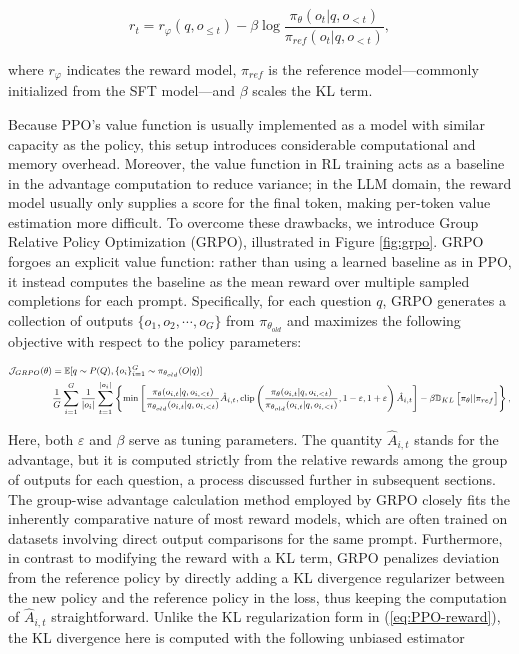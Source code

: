 \begin{equation}
    r_{t} = r_\varphi(q, o_{\le t}) - \beta \log\frac{\pi_{\theta}(o_{t}|q, o_{<t})}{\pi_{ref}(o_{t}|q, o_{<t})},
\label{eq:PPO-reward}
\end{equation}

where $r_\varphi$ indicates the reward model, $\pi_{ref}$ is the reference model—commonly initialized from the SFT model—and $\beta$ scales the KL term.

Because PPO’s value function is usually implemented as a model with similar capacity as the policy, this setup introduces considerable computational and memory overhead. Moreover, the value function in RL training acts as a baseline in the advantage computation to reduce variance; in the LLM domain, the reward model usually only supplies a score for the final token, making per-token value estimation more difficult. To overcome these drawbacks, we introduce Group Relative Policy Optimization (GRPO), illustrated in Figure \ref{fig:grpo}. GRPO forgoes an explicit value function: rather than using a learned baseline as in PPO, it instead computes the baseline as the mean reward over multiple sampled completions for each prompt. Specifically, for each question $q$, GRPO generates a collection of outputs $\{o_1, o_2, \cdots, o_G\}$ from $\pi_{\theta_{old}}$ and maximizes the following objective with respect to the policy parameters:

\begin{equation}
\footnotesize
\begin{split}
    \mathcal{J}_{GRPO}(\theta) &= \mathbb{E}{[q \sim P(Q), \{o_i\}_{i=1}^G \sim \pi_{\theta_{old}}(O|q)]}  \\
    & \frac{1}{G}\sum_{i=1}^G\frac{1}{|o_i|} \sum_{t=1}^{|o_i|} \left\{ \min \left[ \frac{\pi_\theta(o_{i,t} | q, o_{i,<t})}{\pi_{\theta_{old}}(o_{i,t} | q, o_{i,<t})} \hat{A}_{i,t}, \text{clip} \left( \frac{\pi_\theta(o_{i,t} | q, o_{i,<t})}{\pi_{\theta_{old}}(o_{i,t} | q, o_{i,<t})}, 1 - \varepsilon, 1 + \varepsilon \right)  \hat{A}_{i,t} \right] - \beta \mathbb{D}_{KL}\left[\pi_{\theta} || \pi_{ref}\right]\right\} ,
\end{split}
\label{eq:GRPO-obj}
\end{equation}

Here, both $\varepsilon$ and $\beta$ serve as tuning parameters. The quantity $\hat{A}_{i,t}$ stands for the advantage, but it is computed strictly from the relative rewards among the group of outputs for each question, a process discussed further in subsequent sections. The group-wise advantage calculation method employed by GRPO closely fits the inherently comparative nature of most reward models, which are often trained on datasets involving direct output comparisons for the same prompt. Furthermore, in contrast to modifying the reward with a KL term, GRPO penalizes deviation from the reference policy by directly adding a KL divergence regularizer between the new policy and the reference policy in the loss, thus keeping the computation of $\hat{A}_{i,t}$ straightforward. Unlike the KL regularization form in (\ref{eq:PPO-reward}), the KL divergence here is computed with the following unbiased estimator \citep{kl_approx}

